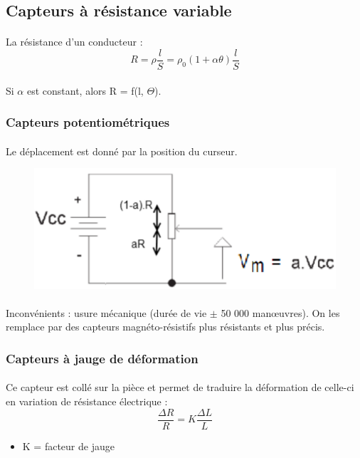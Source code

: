 \documentclass{article}
\begin{document}
\subsection{Capteurs à résistance variable}
\paragraph{}
La résistance d'un conducteur :
$$R = \rho \frac{l}{S} = \rho_0 (1 + \alpha \theta) \frac{l}{S}$$

\paragraph{}
Si $\alpha$ est constant, alors R = f(l, $\Theta$).

\subsubsection{Capteurs potentiométriques}
\paragraph{}
Le déplacement est donné par la position du curseur.

\begin{figure}[H]
    \centering
    \includegraphics[width=0.5\linewidth]{./images/potentiometre.png}
\end{figure}

\paragraph{}
Inconvénients : usure mécanique (durée de vie $\pm$ 50 000 man\oe uvres). On les remplace par des capteurs magnéto-résistifs plus résistants et plus précis.

\subsubsection{Capteurs à jauge de déformation}
\paragraph{}
Ce capteur est collé sur la pièce et permet de traduire la déformation de celle-ci en variation de résistance électrique :
$$\frac{\Delta R}{R} = K \frac{\Delta L}{L}$$
\begin{itemize}
    \item K = facteur de jauge
\end{itemize}
\end{document}
